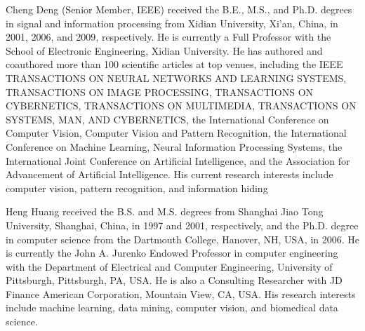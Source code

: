 \documentclass[lettersize,journal]{IEEEtran}
\begin{document}
\vspace{11pt}

\begin{IEEEbiography}{Cheng Deng}
 (Senior Member, IEEE) received the
B.E., M.S., and Ph.D. degrees in signal and information processing from Xidian University, Xi’an,
China, in 2001, 2006, and 2009, respectively.
He is currently a Full Professor with the School
of Electronic Engineering, Xidian University. He has
authored and coauthored more than 100 scientific
articles at top venues, including the IEEE TRANSACTIONS ON NEURAL NETWORKS AND LEARNING
SYSTEMS, TRANSACTIONS ON IMAGE PROCESSING, TRANSACTIONS ON CYBERNETICS, TRANSACTIONS ON MULTIMEDIA, TRANSACTIONS ON SYSTEMS, MAN, AND
CYBERNETICS, the International Conference on Computer Vision, Computer
Vision and Pattern Recognition, the International Conference on Machine
Learning, Neural Information Processing Systems, the International Joint
Conference on Artificial Intelligence, and the Association for Advancement of
Artificial Intelligence. His current research interests include computer vision,
pattern recognition, and information hiding
\end{IEEEbiography}

\vspace{11pt}

\begin{IEEEbiography}{Heng Huang}
received the B.S. and M.S. degrees
from Shanghai Jiao Tong University, Shanghai,
China, in 1997 and 2001, respectively, and the Ph.D.
degree in computer science from the Dartmouth
College, Hanover, NH, USA, in 2006.
He is currently the John A. Jurenko Endowed
Professor in computer engineering with the Department of Electrical and Computer Engineering, University of Pittsburgh, Pittsburgh, PA, USA. He is
also a Consulting Researcher with JD Finance American Corporation, Mountain View, CA, USA. His
research interests include machine learning, data mining, computer vision,
and biomedical data science.
\end{IEEEbiography}

\vspace{11pt}
\end{document}
